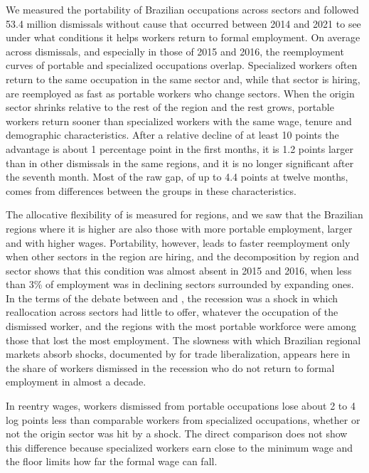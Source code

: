 \documentclass[11pt,a4paper]{article}
\let\citetorig\citet
\renewcommand{\citet}[1]{{\color{citeblue}\citetorig{#1}}}
\begin{document}
We measured the portability of Brazilian occupations across sectors and followed 53.4 million dismissals without cause that occurred between 2014 and 2021 to see under what conditions it helps workers return to formal employment. On average across dismissals, and especially in those of 2015 and 2016, the reemployment curves of portable and specialized occupations overlap. Specialized workers often return to the same occupation in the same sector and, while that sector is hiring, are reemployed as fast as portable workers who change sectors. When the origin sector shrinks relative to the rest of the region and the rest grows, portable workers return sooner than specialized workers with the same wage, tenure and demographic characteristics. After a relative decline of at least 10 points the advantage is about 1 percentage point in the first months, it is 1.2 points larger than in other dismissals in the same regions, and it is no longer significant after the seventh month. Most of the raw gap, of up to 4.4 points at twelve months, comes from differences between the groups in these characteristics.

The allocative flexibility of \citet{barros1997ppp} is measured for regions, and we saw that the Brazilian regions where it is higher are also those with more portable employment, larger and with higher wages. Portability, however, leads to faster reemployment only when other sectors in the region are hiring, and the decomposition by region and sector shows that this condition was almost absent in 2015 and 2016, when less than 3\% of employment was in declining sectors surrounded by expanding ones. In the terms of the debate between \citet{lilien1982} and \citet{abraham1986}, the recession was a shock in which reallocation across sectors had little to offer, whatever the occupation of the dismissed worker, and the regions with the most portable workforce were among those that lost the most employment. The slowness with which Brazilian regional markets absorb shocks, documented by \citet{dixcarneiro2017} for trade liberalization, appears here in the share of workers dismissed in the recession who do not return to formal employment in almost a decade.

In reentry wages, workers dismissed from portable occupations lose about 2 to 4 log points less than comparable workers from specialized occupations, whether or not the origin sector was hit by a shock. The direct comparison does not show this difference because specialized workers earn close to the minimum wage and the floor limits how far the formal wage can fall.
\end{document}
